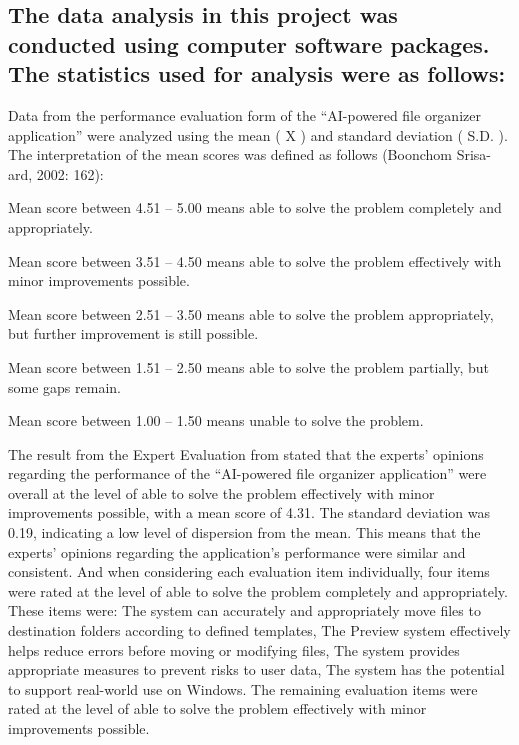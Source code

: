\documentclass[12pt,oneside,openright,a4paper]{cpe-english-project}
\begin{document}
\subsection*{The data analysis in this project was conducted using computer software packages. The statistics used for analysis were as follows:}
Data from the performance evaluation form of the ``AI-powered file organizer application'' were analyzed using the mean ( X ) and standard deviation ( S.D. ). The interpretation of the mean scores was defined as follows (Boonchom Srisa-ard, 2002: 162):

\vspace{1em}

Mean score between 4.51 -- 5.00 means able to solve the problem completely and appropriately.

Mean score between 3.51 -- 4.50 means able to solve the problem effectively with minor improvements possible.

Mean score between 2.51 -- 3.50 means able to solve the problem appropriately, but further improvement is still possible.

Mean score between 1.51 -- 2.50 means able to solve the problem partially, but some gaps remain.

Mean score between 1.00 -- 1.50 means unable to solve the problem.
\vspace{1ex}

The result from the Expert Evaluation from stated that the experts' opinions regarding the performance of the ``AI-powered file organizer application'' were overall at the level of able to solve the problem effectively with minor improvements possible, with a mean score of 4.31. The standard deviation was 0.19, indicating a low level of dispersion from the mean. This means that the experts' opinions regarding the application's performance were similar and consistent. And when considering each evaluation item individually, four items were rated at the level of able to solve the problem completely and appropriately. These items were: The system can accurately and appropriately move files to destination folders according to defined templates, The Preview system effectively helps reduce errors before moving or modifying files, The system provides appropriate measures to prevent risks to user data, The system has the potential to support real-world use on Windows. The remaining evaluation items were rated at the level of able to solve the problem effectively with minor improvements possible.
\end{document}
